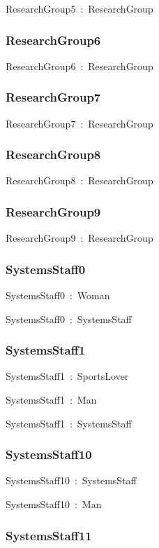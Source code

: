 \documentclass{article}
\begin{document}
ResearchGroup5~:~ResearchGroup

\subsubsection*{ResearchGroup6}

ResearchGroup6~:~ResearchGroup

\subsubsection*{ResearchGroup7}

ResearchGroup7~:~ResearchGroup

\subsubsection*{ResearchGroup8}

ResearchGroup8~:~ResearchGroup

\subsubsection*{ResearchGroup9}

ResearchGroup9~:~ResearchGroup

\subsubsection*{SystemsStaff0}

SystemsStaff0~:~Woman

SystemsStaff0~:~SystemsStaff

\subsubsection*{SystemsStaff1}

SystemsStaff1~:~SportsLover

SystemsStaff1~:~Man

SystemsStaff1~:~SystemsStaff

\subsubsection*{SystemsStaff10}

SystemsStaff10~:~SystemsStaff

SystemsStaff10~:~Man

\subsubsection*{SystemsStaff11}
\end{document}
